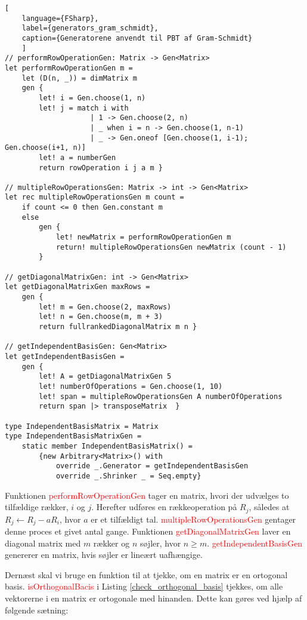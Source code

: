 \begin{lstlisting}[
    language={FSharp}, 
    label={generators_gram_schmidt}, 
    caption={Generatorene anvendt til PBT af Gram-Schmidt}
    ]
// performRowOperationGen: Matrix -> Gen<Matrix>
let performRowOperationGen m =
    let (D(n, _)) = dimMatrix m
    gen { 
        let! i = Gen.choose(1, n)
        let! j = match i with
                    | 1 -> Gen.choose(2, n)
                    | _ when i = n -> Gen.choose(1, n-1)
                    | _ -> Gen.oneof [Gen.choose(1, i-1); Gen.choose(i+1, n)]
        let! a = numberGen
        return rowOperation i j a m }

// multipleRowOperationsGen: Matrix -> int -> Gen<Matrix>
let rec multipleRowOperationsGen m count =
    if count <= 0 then Gen.constant m
    else
        gen {
            let! newMatrix = performRowOperationGen m
            return! multipleRowOperationsGen newMatrix (count - 1)
        }

// getDiagonalMatrixGen: int -> Gen<Matrix>
let getDiagonalMatrixGen maxRows =
    gen { 
        let! m = Gen.choose(2, maxRows)
        let! n = Gen.choose(m, m + 3)   
        return fullrankedDiagonalMatrix m n }
        
// getIndependentBasisGen: Gen<Matrix>
let getIndependentBasisGen =
    gen { 
        let! A = getDiagonalMatrixGen 5
        let! numberOfOperations = Gen.choose(1, 10)
        let! span = multipleRowOperationsGen A numberOfOperations
        return span |> transposeMatrix  }

type IndependentBasisMatrix = Matrix
type IndependentBasisMatrixGen =
    static member IndependentBasisMatrix() =
        {new Arbitrary<Matrix>() with 
            override _.Generator = getIndependentBasisGen
            override _.Shrinker _ = Seq.empty}
\end{lstlisting}

Funktionen \textcolor{red}{performRowOperationGen} tager en matrix, hvori der udvælges to tilfældige rækker, \(i\) og \(j\). Herefter udføres en rækkeoperation på \(R_j\), således at \(R_j \leftarrow R_j - aR_i\), hvor \(a\) er et tilfældigt tal. \textcolor{red}{multipleRowOperationsGen} gentager denne proces et givet antal gange. Funktionen \textcolor{red}{getDiagonalMatrixGen} laver en diagonal matrix med \(m\) rækker og \(n\) søjler, hvor \(n \geq m\). \textcolor{red}{getIndependentBasisGen} genererer en matrix, hvis søjler er lineært uafhængige. 

Dernæst skal vi bruge en funktion til at tjekke, om en matrix er en ortogonal basis. \textcolor{red}{isOrthogonalBacis} i Listing \ref{check_orthogonal_basis} tjekkes, om alle vektorerne i en matrix er ortogonale med hinanden. Dette kan gøres ved hjælp af følgende sætning:

